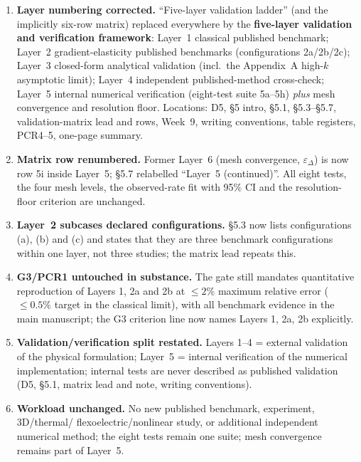 \documentclass[11pt,a4paper]{article}
\begin{document}
\begin{enumerate}[label=\textbf{M\arabic*.}]
\item \textbf{Layer numbering corrected.} ``Five-layer validation ladder'' (and the
implicitly six-row matrix) replaced everywhere by the \textbf{five-layer validation and
verification framework}: Layer~1 classical published benchmark; Layer~2 gradient-elasticity
published benchmarks (configurations 2a/2b/2c); Layer~3 closed-form analytical validation
(incl.\ the Appendix~A high-$k$ asymptotic limit); Layer~4 independent published-method
cross-check; Layer~5 internal numerical verification (eight-test suite 5a--5h) \emph{plus}
mesh convergence and resolution floor. Locations: D5, \S5 intro, \S5.1, \S5.3--\S5.7,
validation-matrix lead and rows, Week~9, writing conventions, table registers, PCR4--5,
one-page summary.
\item \textbf{Matrix row renumbered.} Former Layer~6 (mesh convergence, $\varepsilon_\Delta$)
is now row 5i inside Layer~5; \S5.7 relabelled ``Layer~5 (continued)''. All eight tests, the
four mesh levels, the observed-rate fit with 95\% CI and the resolution-floor criterion are
unchanged.
\item \textbf{Layer~2 subcases declared configurations.} \S5.3 now lists configurations
(a), (b) and (c) and states that they are three benchmark configurations within one layer,
not three studies; the matrix lead repeats this.
\item \textbf{G3/PCR1 untouched in substance.} The gate still mandates quantitative
reproduction of Layers 1, 2a and 2b at $\le2\%$ maximum relative error ($\le0.5\%$ target
in the classical limit), with all benchmark evidence in the main manuscript; the G3
criterion line now names Layers 1, 2a, 2b explicitly.
\item \textbf{Validation/verification split restated.} Layers 1--4 = external validation of
the physical formulation; Layer~5 = internal verification of the numerical implementation;
internal tests are never described as published validation (D5, \S5.1, matrix lead and
note, writing conventions).
\item \textbf{Workload unchanged.} No new published benchmark, experiment, 3D/thermal/
flexoelectric/nonlinear study, or additional independent numerical method; the eight tests
remain one suite; mesh convergence remains part of Layer~5.
\end{enumerate}
\end{document}
